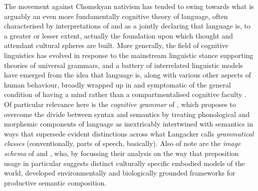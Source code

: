 The movement against Chomskyan nativism has tended to swing towards what is arguably an even more fundamentally cognitive theory of language, often characterised by interpretations of \cite{Sapir1929} and \cite{Whorf1940} as a jointly declaring that language is, to a greater or lesser extent, actually the foundation upon which thought and attendant cultural spheres are built.  More generally, the field of cognitive linguistics has evolved in response to the mainstream linguistic stance supporting theories of universal grammars, and a battery of interrelated linguistic models have emerged from the idea that language is, along with various other aspects of human behaviour, broadly wrapped up in and symptomatic of the general condition of having a mind rather than a compartmentalised cognitive faculty \citep{CroftEA2004}.  Of particular relevance here is the \emph{cognitive grammar} of \cite{Langacker1987}, which proposes to overcome the divide between syntax and semantics by treating phonological and morphemic components of language as inextricably intertwined with semantics in ways that supersede evident distinctions across what Langacker calls \emph{grammatical classes} (conventionally, parts of speech, basically).  Also of note are the \emph{image schema} of \cite{Lakoff1987} and \cite{Johnson1990}, who, by focussing their analysis on the way that preposition usage in particular suggests distinct culturally specific embodied models of the world, developed environmentally and biologically grounded frameworks for productive semantic composition.


